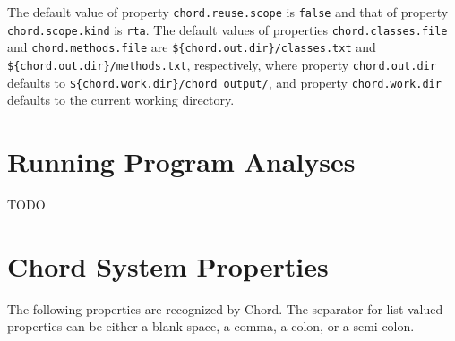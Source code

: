 \documentclass{article}
\begin{document}
The default value of property \verb+chord.reuse.scope+ is \verb+false+ and that of
property \verb+chord.scope.kind+ is \verb+rta+.
The default values of properties \verb+chord.classes.file+ and \verb+chord.methods.file+ are
\verb+${chord.out.dir}/classes.txt+ and \verb+${chord.out.dir}/methods.txt+, respectively,
where property \verb+chord.out.dir+ defaults to \verb+${chord.work.dir}/chord_output/+,
and property \verb+chord.work.dir+ defaults to the current working directory.

\texonly{\newpage}
\section{Running Program Analyses}
\label{sec:running-analyses}

TODO


\texonly{\newpage}
\section{Chord System Properties}
\label{sec-sys-props}

The following properties are recognized by Chord.
The separator for list-valued properties can be either a blank space, a comma, a colon, or a semi-colon.
\end{document}
